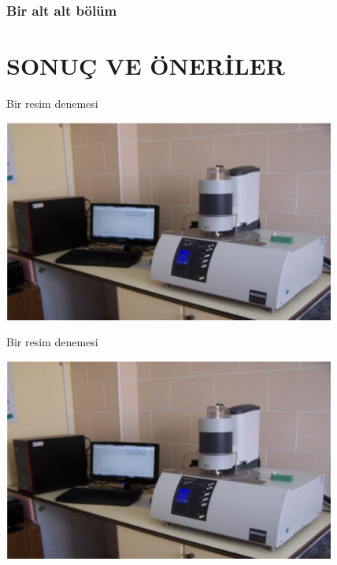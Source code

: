 \documentclass[
oneside, %
doktora, %
]{aufbetez} %
\begin{document}
\subsection{Bir alt alt bölüm}
\lipsum

\chapter{SONUÇ VE ÖNERİLER}
\lipsum


\begin{thesispicture}{Bir resim denemesi}
		\begin{center}
		\includegraphics[scale=0.75]{resim}
	\end{center}
\end{thesispicture}

\lipsum

\begin{thesispicture}{Bir resim denemesi}
		\begin{center}
		\includegraphics[scale=0.75]{resim}
	\end{center}
\end{thesispicture}

\lipsum
\end{document}
